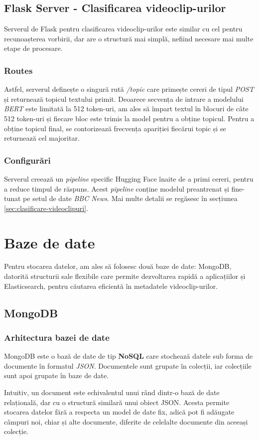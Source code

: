 \subsection{Flask Server - Clasificarea videoclip-urilor}
Serverul de Flask pentru clasificarea videoclip-urilor este similar cu cel pentru recunoașterea vorbirii,
dar are o structură mai simplă, nefiind necesare mai multe etape de procesare.
\subsubsection{Routes}
\par
Astfel, serverul definește o singură rută \textit{/topic} care primește cereri de tipul \textit{POST}
și returnează topicul textului primit. Deoarece secvența de intrare a modelului \textit{BERT} este 
limitată la 512 token-uri, am ales să împart textul în blocuri de câte 512 token-uri și fiecare bloc
este trimis la model pentru a obține topicul. Pentru a obține topicul final, se contorizează frecvența
apariției fiecărui topic și se returnează cel majoritar.
\subsubsection{Configurări}
\par
Serverul creează un \textit{pipeline} specific Hugging Face înaite de a primi cereri, pentru a reduce
timpul de răspuns. Acest \textit{pipeline} conține modelul preantrenat și fine-tunat pe setul de date
\textit{BBC News}. Mai multe detalii se regăsesc în secțiunea \ref{sec:clasificare-videoclipuri}.

\section{Baze de date}
Pentru stocarea datelor, am ales să folosesc două baze de date: MongoDB, datorită structurii sale
flexibile care permite dezvoltarea rapidă a aplicațiilor și Elasticsearch, pentru căutarea eficientă
în metadatele videoclip-urilor.
\subsection{MongoDB}
\subsubsection{Arhitectura bazei de date}
MongoDB este o bază de date de tip \textbf{NoSQL} care stochează datele sub forma de documente în 
formatul \textit{JSON}. Documentele sunt grupate în colecții, iar colecțiile sunt apoi grupate în
baze de date. 
\par
Intuitiv, un document este echivalentul unui rând dintr-o bază de date relațională, dar cu o structură
similară unui obiect JSON. Acesta permite stocarea datelor fără a respecta un model de date fix, adică
pot fi adăugate câmpuri noi, chiar și alte documente, diferite de celelalte documente din aceeași colecție.

